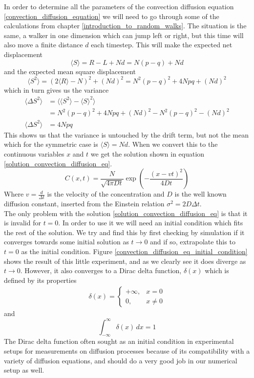 In order to determine all the parameters of the convection diffusion equation \ref{convection_diffusion_equation} we will need to go through some of the calculations from chapter \ref{introduction_to_random_walks}. 
The situation is the same, a walker in one dimension which can jump left or right, but this time will also move a finite distance $d$ each timestep. 
This will make the expected net displacement
\begin{equation*}
 \langle S\rangle = R-L +Nd = N(p-q) + Nd
\end{equation*}
and the expected mean square displacement
\begin{equation*}
 \langle S^2\rangle = (2\langle R\rangle -N)^2 +(Nd)^2 = N^2(p-q)^2 +4Npq +(Nd)^2
\end{equation*}
which in turn gives us the variance
\begin{align*}
 \langle \Delta S^2\rangle &= \langle\langle S^2\rangle-\langle S\rangle^2\rangle \\
 &= N^2(p-q)^2 +4Npq +(Nd)^2 - N^2(p-q)^2 -(Nd)^2 \\
\langle \Delta S^2\rangle &= 4Npq
\end{align*}
This shows us that the variance is untouched by the drift term, but not the mean which for the symmetric case is $\langle S\rangle = Nd$. 
When we convert this to the continuous variables $x$ and $t$ we get the solution shown in equation \ref{solution_convection_diffusion_eq}.
\begin{equation}\label{solution_convection_diffusion_eq}
 C(x,t) = \frac{N}{\sqrt{4\pi Dt}}\exp\left(-\frac{(x-vt)^2}{4Dt}\right)
\end{equation}
Where $v = \frac{d}{\Delta t}$ is the velocity of the concentration and $D$ is the well known diffusion constant, inserted from the Einstein relation $\sigma^2 = 2D\Delta t$.\\
The only problem with the solution \ref{solution_convection_diffusion_eq} is that it is invalid for $t=0$. 
In order to use it we will need an initial condition which fits the rest of the solution. 
We try and find this by first checking by simulation if it converges towards some initial solution as $t\to0$ and if so, extrapolate this to $t=0$ as the initial condition. 
Figure \ref{convection_diffusion_eq_initial_condition} shows the result of this little experiment, and as we clearly see it does diverge as $t\to0$. 
However, it also converges to a Dirac delta function, $\delta(x)$ which is defined by its properties
\begin{align*}
\delta(x) = \begin{cases} +\infty, & x = 0 \\ 0, & x \ne 0 \end{cases}
\end{align*}
and
\begin{equation*}
 \int_{-\infty}^\infty \delta(x) \, dx = 1
\end{equation*}
The Dirac delta function often sought as an initial condition in experimental setups for measurements on diffusion processes because of its compatibility with a variety of diffusion equations, and should do a very good job in our numerical setup as well. 

